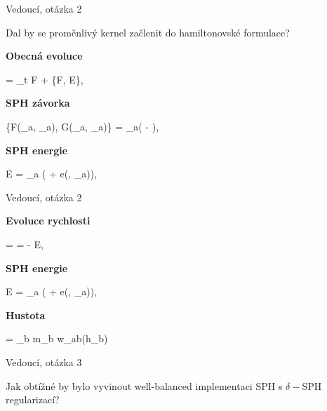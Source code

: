 \documentclass[10pt, aspectratio=169, t]{beamer}
\begin{document}
\begin{qaframe}{Vedoucí, otázka 2}
	\begin{question}
		Dal by se proměnlivý kernel začlenit do hamiltonovské formulace?
	\end{question}

	\begin{answer}
		\textbf{Obecná evoluce}
		\begin{equations}[single,!,numberline=all,noskip]
		\label{eq:OBECNA}
		 = \partial_t F + \{F, E\},
		\end{equations}

		\textbf{SPH závorka}
		\begin{equations}[single,!,numberline=all,noskip]
		\label{eq:PB}
			\{F\left(_a, _a\right), G\left(_a, _a\right)\} = \sum_{a}\left(  - \right),
		\end{equations}

		\textbf{SPH energie}
		\begin{equations}[single,!,numberline=all,noskip]
		\label{eq:ENERGY}
		E = \sum_{a} \left( + e\left(, \eta_a\right)\right),
		\end{equations}


	\end{answer}
\end{qaframe}

\begin{qaframe}{Vedoucí, otázka 2}
	\begin{answer}
		\textbf{Evoluce rychlosti}
		\begin{equations}[single,!,numberline=all]
		\label{eq:CANONICAL}
		 =   = -  \link[h]{\grad_a} E,
		\end{equations}

		\textbf{SPH energie}
		\begin{equations}[single,!,numberline=all]
		\label{eq:ENERGY}
		E = \sum_{a} \left( + e\left(, \eta_a\right)\right),
		\end{equations}

		\textbf{Hustota}
		\begin{equations}[single,!,numberline=all]
		\label{eq:DENSITY}
		 = \sum_{b} m_b w_{ab}\left(h_b\right)
		\end{equations}
	\end{answer}
\end{qaframe}

\begin{qaframe}{Vedoucí, otázka 3}
	\begin{question}
		Jak obtížné by bylo vyvinout well-balanced implementaci SPH s $\delta-$SPH regularizací?
	\end{question}

\end{qaframe}
\end{document}
